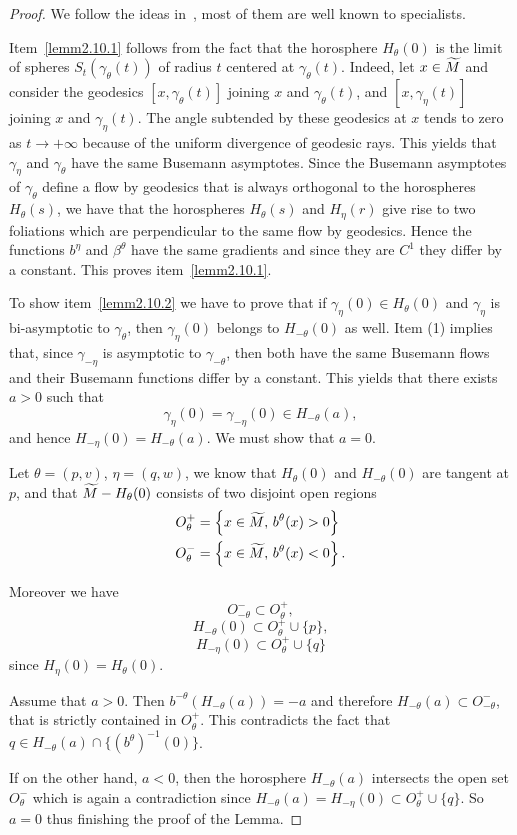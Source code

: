 \documentclass[AHL,Unicode,longabstracts,published]{cedram}
\let\oldtilde\tilde
\renewcommand*{\tilde}[1]{\mathchoice{\widetilde{#1}}{\widetilde{#1}}{\oldtilde{#1}}{\oldtilde{#1}}}
\begin{document}
\begin{proof}
We follow the ideas in~\cite{kn:Ruggiero-Asterisque}, most of them are well known to specialists.

Item~\eqref{lemm2.10.1} follows from the fact that the horosphere $H_{\theta}(0)$ is the limit of spheres $S_{t}(\gamma_{\theta}(t))$ of radius $t$ centered at $\gamma_{\theta}(t)$. Indeed, let $ x \in \tilde{M}$ and consider the geodesics $[x, \gamma_{\theta}(t)]$ joining $x$ and $\gamma_{\theta}(t)$, and $[x,\gamma_{\eta}(t)]$ joining $x$ and $\gamma_{\eta}(t)$. The angle subtended by these geodesics at $x$ tends to zero as $t \rightarrow +\infty$ because of the uniform divergence of geodesic rays. This yields that $\gamma_{\eta}$ and $\gamma_{\theta}$ have the same Busemann asymptotes. Since the Busemann asymptotes of $\gamma_{\theta}$ define a flow by geodesics that is always orthogonal to the horospheres $H_{\theta}(s)$, we have that the horospheres $H_{\theta}(s)$ and $H_{\eta}(r)$ give rise to two foliations which are perpendicular to the same flow by geodesics. Hence the functions $b^{\eta}$ and $\beta^{\theta}$ have the same gradients and since they are $C^{1}$ they differ by a constant. This proves item~\eqref{lemm2.10.1}.

To show item~\eqref{lemm2.10.2} we have to prove that if $\gamma_{\eta}(0) \in H_{\theta}(0)$ and $\gamma_{\eta}$ is bi-asymptotic to $\gamma_{\theta}$, then $\gamma_{\eta}(0)$ belongs to $H_{-\theta}(0)$ as well. Item (1) implies that, since $\gamma_{-\eta}$ is asymptotic to $\gamma_{-\theta}$, then both have the same Busemann flows and their Busemann functions differ by a constant. This yields that there exists $a>0$ such that
\[
\gamma_{\eta}(0) = \gamma_{-\eta}(0) \in H_{-\theta}(a),
\]
and hence $H_{-\eta}(0) = H_{-\theta}(a)$. We must show that $a =0$.

Let $\theta = (p,v)$, $\eta = (q, w)$, we know that $H_{\theta}(0)$ and $H_{-\theta}(0)$ are tangent at $p$, and that $\tilde{M}- H_{\theta}(0)$ consists of two disjoint open regions
\begin{align*}
O_{\theta}^{+} &= \left\{x\in \tilde{M}, \,b^{\theta}(x) >0\right\}
\\
O_{\theta}^{-} &= \left\{x\in \tilde{M}, \,b^{\theta}(x) <0\right\}.
\end{align*}

Moreover we have
\[
O_{-\theta}^{-} \subset O_{\theta}^{+},
\]
\[
H_{-\theta}(0) \subset O_{\theta}^{+} \cup \{p \},
\]
\[
H_{-\eta}(0) \subset O_{\theta}^{+} \cup \{q\}
\]
since $H_{\eta}(0) = H_{\theta}(0)$.

Assume that $a>0$. Then $b^{-\theta}(H_{-\theta}(a)) =-a$ and therefore $H_{-\theta}(a) \subset O_{-\theta}^{-}$, that is strictly contained in $O_{\theta}^{+}$. This contradicts the fact that $q \in H_{-\theta}(a) \cap \{ (b^{\theta})^{-1}(0) \}$.

If on the other hand, $a<0$, then the horosphere $H_{-\theta}(a)$ intersects the open set $O_{\theta}^{-}$ which is again a contradiction since $H_{-\theta}(a) = H_{-\eta}(0) \subset O_{\theta}^{+} \cup \{q\}$. So $a=0$ thus finishing the proof of the Lemma.
\end{proof}
\end{document}
